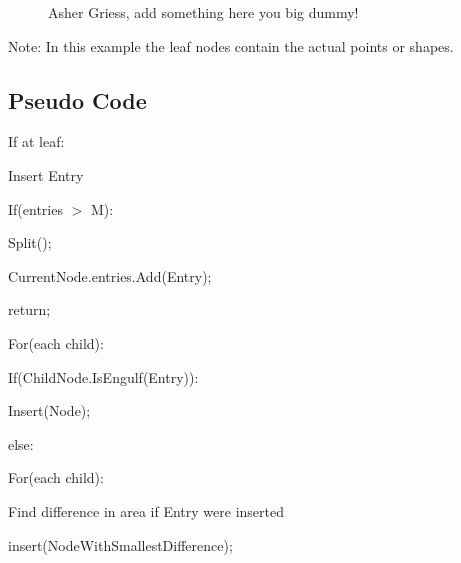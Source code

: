 \documentclass{article}
\begin{document}
\begin{figure}
\caption{Asher Griess, add something here you big dummy!}
\centering
{}
\end{figure}


Note: In this example the leaf nodes contain the actual points or shapes.
\subsection*{Pseudo Code}
\begin{flushleft}

    
If at leaf:

\quad Insert Entry

\quad If(entries $>$ M):

\quad \quad Split();

\quad CurrentNode.entries.Add(Entry);

\quad return;


For(each child):


\quad If(ChildNode.IsEngulf(Entry)):

 \quad \quad Insert(Node);


else:

\quad For(each child):

    \quad \quad
    Find difference in area if Entry were inserted

    \quad insert(NodeWithSmallestDifference);
\end{flushleft}
\end{document}
